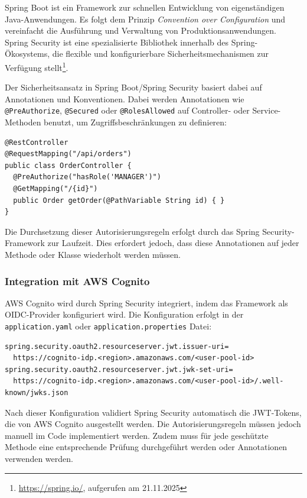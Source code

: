 Spring Boot ist ein Framework zur schnellen Entwicklung von eigenständigen Java-Anwendungen. Es folgt dem Prinzip \textit{Convention over Configuration} und vereinfacht die Ausführung und Verwaltung von Produktionsanwendungen. Spring Security ist eine spezialisierte Bibliothek innerhalb des Spring-Ökosystems, die flexible und konfigurierbare Sicherheitsmechanismen zur Verfügung stellt\footnote{\url{https://spring.io/}, aufgerufen am 21.11.2025}.

Der Sicherheitsansatz in Spring Boot/Spring Security basiert dabei auf Annotationen und Konventionen. Dabei werden Annotationen wie \texttt{@PreAuthorize}, \texttt{@Secured} oder \texttt{@RolesAllowed} auf Controller- oder Service-Methoden benutzt, um Zugriffsbeschränkungen zu definieren:

\begin{verbatim}
@RestController
@RequestMapping("/api/orders")
public class OrderController {
  @PreAuthorize("hasRole('MANAGER')")
  @GetMapping("/{id}")
  public Order getOrder(@PathVariable String id) { }
}
\end{verbatim}

Die Durchsetzung dieser Autorisierungsregeln erfolgt durch das Spring Security-Framework zur Laufzeit. Dies erfordert jedoch, dass diese Annotationen auf jeder Methode oder Klasse wiederholt werden müssen.

\subsubsection{Integration mit AWS Cognito}

\ac{AWS} Cognito wird durch Spring Security integriert, indem das Framework als \ac{OIDC}-Provider konfiguriert wird. Die Konfiguration erfolgt in der \texttt{application.yaml} oder \texttt{application.properties} Datei:

\begin{verbatim}
spring.security.oauth2.resourceserver.jwt.issuer-uri=
  https://cognito-idp.<region>.amazonaws.com/<user-pool-id>
spring.security.oauth2.resourceserver.jwt.jwk-set-uri=
  https://cognito-idp.<region>.amazonaws.com/<user-pool-id>/.well-known/jwks.json
\end{verbatim}

Nach dieser Konfiguration validiert Spring Security automatisch die \ac{JWT}-Tokens, die von \ac{AWS} Cognito ausgestellt werden. Die Autorisierungsregeln müssen jedoch manuell im Code implementiert werden. Zudem muss für jede geschützte Methode eine entsprechende Prüfung durchgeführt werden oder Annotationen verwenden werden.


